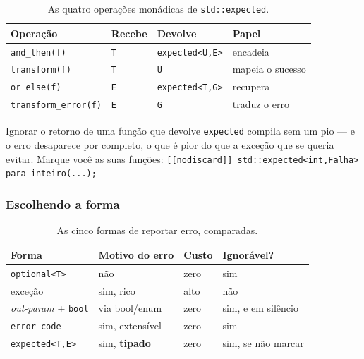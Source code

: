 \begin{table}[htbp]
\centering
\caption{As quatro operações monádicas de \texttt{std::expected}.}
\label{tab:monadicas}
\footnotesize
\begin{tabular}{@{}llll@{}}
\toprule
\textbf{Operação} & \textbf{Recebe} & \textbf{Devolve} & \textbf{Papel} \\
\midrule
\texttt{and\_then(f)}        & \texttt{T} & \texttt{expected<U,E>} & encadeia \\
\texttt{transform(f)}        & \texttt{T} & \texttt{U}             & mapeia o sucesso \\
\texttt{or\_else(f)}         & \texttt{E} & \texttt{expected<T,G>} & recupera \\
\texttt{transform\_error(f)} & \texttt{E} & \texttt{G}             & traduz o erro \\
\bottomrule
\end{tabular}
\end{table}

\begin{armadilha}
Ignorar o retorno de uma função que devolve \texttt{expected} compila sem um
pio --- e o erro desaparece por completo, o que é pior do que a exceção que se
queria evitar. Marque você as suas funções:
\texttt{[[nodiscard]] std::expected<int,Falha> para\_inteiro(...);}
\end{armadilha}

\subsubsection{Escolhendo a forma}

\begin{table}[htbp]
\centering
\caption{As cinco formas de reportar erro, comparadas.}
\label{tab:formas-erro}
\footnotesize
\begin{tabular}{@{}llll@{}}
\toprule
\textbf{Forma} & \textbf{Motivo do erro} & \textbf{Custo} & \textbf{Ignorável?} \\
\midrule
\texttt{optional<T>}          & não             & zero  & sim \\
exceção                       & sim, rico       & alto  & não \\
\emph{out-param} + \texttt{bool} & via bool/enum & zero  & sim, e em silêncio \\
\texttt{error\_code}          & sim, extensível & zero  & sim \\
\texttt{expected<T,E>}        & sim, \textbf{tipado} & zero & sim, se não marcar \\
\bottomrule
\end{tabular}
\end{table}

